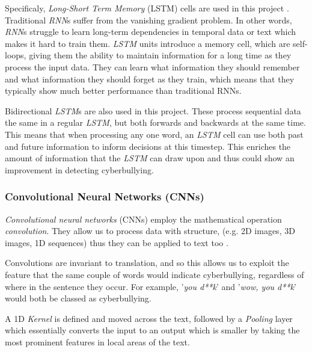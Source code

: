 \documentclass[12pt,a4paper]{article}
\begin{document}
	Specificaly, \textit{Long-Short Term Memory} (LSTM) cells are used in this project \cite[p.410]{DL}. Traditional \textit{RNN}s suffer from the vanishing gradient problem. In other words, \textit{RNN}s struggle to learn long-term dependencies in temporal data or text which makes it hard to train them. \textit{LSTM} units introduce a memory cell, which are self-loops, giving them the ability to maintain information for a long time as they process the input data. They can learn what information they should remember and what information they should forget as they train, which means that they typically show much better performance than traditional RNNs.
	
	Bidirectional \textit{LSTM}s are also used in this project. These process sequential data the same in a regular \textit{LSTM}, but both forwards and backwards at the same time. This means that when processing any one word, an \textit{LSTM} cell can use both past and future information to inform decisions at this timestep. This enriches the amount of information that the \textit{LSTM} can draw upon and thus could show an improvement in detecting cyberbullying.
	
	\subsubsection{Convolutional Neural Networks (CNNs)}
	
	\textit{Convolutional neural networks} (CNNs) employ the mathematical operation \textit{convolution}. They allow us to process data with structure, (e.g. 2D images, 3D images, 1D sequences) thus they can be applied to text too \cite[p.330]{DL}.
	
	Convolutions are invariant to translation, and so this allows us to exploit the feature that the same couple of words would indicate cyberbullying, regardless of where in the sentence they occur. For example, '\textit{you d**k}' and '\textit{wow, you d**k}' would both be classed as cyberbullying.
	
	A 1D \textit{Kernel} is defined and moved across the text, followed by a \textit{Pooling} layer which essentially converts the input to an output which is smaller by taking the most prominent features in local areas of the text. \cite[p.339]{DL} 
	
\end{document}

